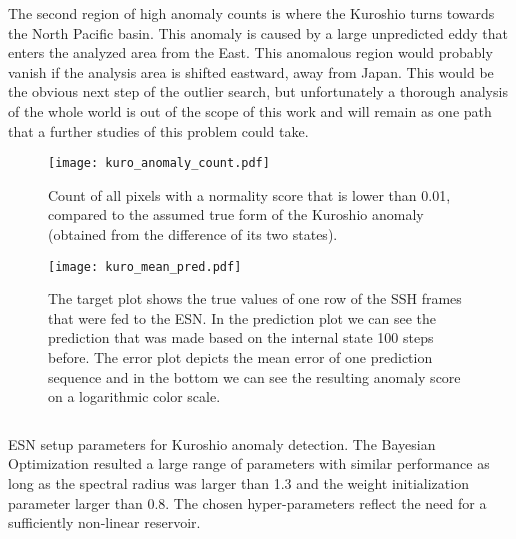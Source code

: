 The second region of high anomaly counts is where the Kuroshio turns towards
the North Pacific basin. This anomaly is caused by a large unpredicted  eddy
that enters the analyzed area from the East. This anomalous region would
probably vanish if the analysis area is shifted eastward, away from Japan.
This would be the obvious next step of the outlier search, but unfortunately a
thorough analysis of the whole world is out of the scope of this work and will
remain as one path that a further studies of this problem could take.
\begin{figure}
  \centering
  \texttt{[image: kuro\_anomaly\_count.pdf]}
  \caption{Count of all pixels with a normality score that is lower than 0.01,
  compared to the assumed true form of the Kuroshio anomaly (obtained from the
  difference of its two states).}
  \label{fig:kuro_anomaly_count}
\end{figure}


\begin{figure}
  \centering
  \texttt{[image: kuro\_mean\_pred.pdf]}
  \caption{The target plot shows the true values of one row of the SSH
    frames that were fed to the ESN.  In the prediction plot we can see the
    prediction that was made based on the internal state 100 steps before.
    The error plot depicts the mean error of one prediction sequence and in the
    bottom we can see the resulting anomaly score on a logarithmic color scale.
  }
  \label{fig:kuro_mean_pred}
\end{figure}

\begin{listing}
  \inputminted{json}{pseudocode/model_setups/kuro_setup.json}
  \label{lst:kuro_setup}
  \caption{ESN setup parameters for Kuroshio anomaly detection. The Bayesian
  Optimization resulted a large range of parameters with similar performance as
  long as the spectral radius was larger than 1.3 and the weight initialization
  parameter larger than 0.8. The chosen hyper-parameters reflect the need for a
  sufficiently non-linear reservoir.}
\end{listing}

